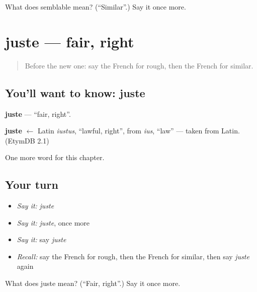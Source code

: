 \begin{tcolorbox}[breakable,colback=teal!4,colframe=teal!35!black,title={Before you move on}]
What does semblable mean? (\textquotedblleft{}Similar\textquotedblright{}.) Say it once more.
\end{tcolorbox}
\section[juste]{juste — fair, right}

\label{lesson:FR-C245-juste}



\begin{quote}
Before the new one: say the French for rough, then the French for similar.
\end{quote}

\subsection*{You'll want to know: juste}
\textbf{juste} — \textquotedblleft{}fair, right\textquotedblright{}.

\begin{cousinweb}
\textbf{juste} $\leftarrow$ Latin \emph{iustus}, \textquotedblleft{}lawful, right\textquotedblright{}, from \emph{ius}, \textquotedblleft{}law\textquotedblright{} — taken from Latin. (EtymDB 2.1)
\end{cousinweb}

\begin{grammarlens}[title={What you've built}]
One more word for this chapter.
\end{grammarlens}

\subsection*{Your turn}
\begin{itemize}
\raggedright
  \item \emph{Say it:} \emph{juste}
  \item \emph{Say it:} \emph{juste}, once more
  \item \emph{Say it:} say \emph{juste}
  \item \emph{Recall:} say the French for rough, then the French for similar, then say \emph{juste} again
\end{itemize}

\begin{tcolorbox}[breakable,colback=teal!4,colframe=teal!35!black,title={Before you move on}]
What does juste mean? (\textquotedblleft{}Fair, right\textquotedblright{}.) Say it once more.
\end{tcolorbox}
